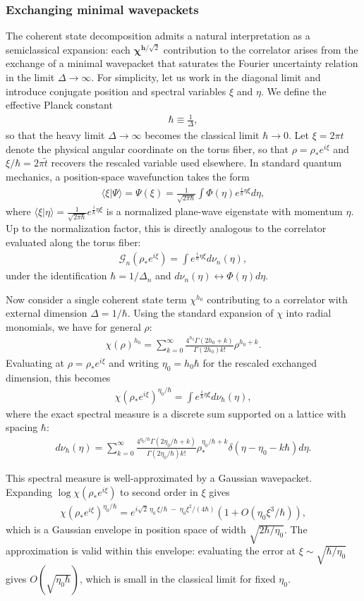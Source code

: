 \documentclass[a4paper,11pt]{article}
\theoremstyle{plain}
\theoremstyle{definition}
\theoremstyle{remark}
\newcommand{\bs}[1]{\boldsymbol{#1}}
\newcommand{\ba}{\begin{equation} \begin{aligned}}
\newcommand{\ea}{\end{aligned} \end{equation}}
\newcommand{\De}{\Delta}
\begin{document}
\subsubsection{Exchanging minimal wavepackets}
The coherent state decomposition admits a natural interpretation as a semiclassical expansion: each $\bs{\chi}^{\bs{h}/\sqrt{2}}$ contribution to the correlator arises from the exchange of a minimal wavepacket that saturates the Fourier uncertainty relation in the limit $\De \to \infty$. For simplicity, let us work in the diagonal limit and introduce conjugate position and spectral variables $\xi$ and $\eta$. We define the effective Planck constant 
\ba
\hbar \equiv \frac{1}{\De},
\ea
so that the heavy limit $\De \to \infty$ becomes the classical limit $\hbar \to 0$. Let $\xi = 2\pi t$ denote the physical angular coordinate on the torus fiber, so that $\rho = \rho_* e^{i\xi}$ and $\xi/\hbar = 2\pi \tilde{t}$ recovers the rescaled variable used elsewhere. In standard quantum mechanics, a position-space wavefunction takes the form
\ba
\langle \xi | \Psi \rangle = \Psi(\xi) = \frac{1}{\sqrt{2\pi \hbar}} \int \Phi(\eta) e^{\frac{i}{\hbar} \eta \xi} d\eta,
\label{wavefunction}
\ea
where $\langle \xi | \eta\rangle = \frac{1}{\sqrt{2\pi\hbar}} e^{\frac{i}{\hbar} \eta \xi}$ is a normalized plane-wave eigenstate with momentum $\eta$. Up to the normalization factor, this is directly analogous to the correlator evaluated along the torus fiber:
\ba
\mathcal{G}_n(\rho_* e^{i\xi}) = \int e^{\frac{i}{\hbar} \eta \xi} d\nu_n(\eta),
\ea
under the identification $\hbar = 1/\De_n$ and $d\nu_n(\eta) \leftrightarrow \Phi(\eta) d\eta$.
 
Now consider a single coherent state term $\chi^{h_0}$ contributing to a correlator with external dimension $\De = 1/\hbar$. Using the standard expansion of $\chi$ into radial monomials, we have for general $\rho$:
\ba
\chi(\rho)^{h_0} = \sum_{k= 0}^\infty \frac{4^{h_0} \Gamma(2h_0 +k)}{\Gamma(2h_0) k! } \rho^{h_0 +k}.
\ea
Evaluating at $\rho = \rho_* e^{i\xi}$ and writing $\eta_0 = h_0 \hbar$ for the rescaled exchanged dimension, this becomes
\ba
\chi(\rho_* e^{i\xi})^{\eta_0/\hbar} = \int e^{\frac{i}{\hbar} \eta \xi} d\nu_\hbar(\eta),
\ea
where the exact spectral measure is a discrete sum supported on a lattice with spacing $\hbar$:
\ba
d\nu_\hbar(\eta) = \sum_{k = 0}^\infty \frac{4^{\eta_0/\hbar} \Gamma(2\eta_0/\hbar +k)}{\Gamma(2\eta_0/\hbar) k!} \rho_*^{\eta_0/\hbar + k} \delta(\eta  -\eta_0 - k \hbar) d\eta.
\label{nuhbarexact}
\ea
 
This spectral measure is well-approximated by a Gaussian wavepacket. Expanding $\log\chi(\rho_* e^{i\xi})$ to second order in $\xi$ gives
\ba
\chi(\rho_* e^{i\xi})^{\eta_0/\hbar} = e^{i\sqrt{2}\, \eta_0\, \xi/\hbar \;-\; \eta_0\xi^2/(4\hbar)} \left( 1 + O(\eta_0 \xi^3/\hbar) \right),
\label{gaussianapprox}
\ea
which is a Gaussian envelope in position space of width $\sqrt{2\hbar/\eta_0}$. The approximation is valid within this envelope: evaluating the error at $\xi \sim \sqrt{\hbar/\eta_0}$ gives $O(\sqrt{\eta_0 \hbar})$, which is small in the classical limit for fixed $\eta_0$.
 
\end{document}
